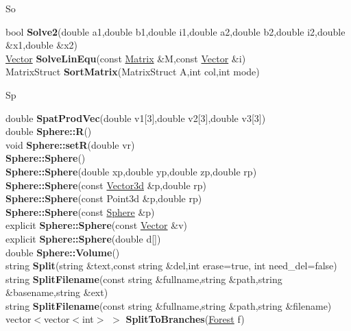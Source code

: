 \documentclass[10pt,titlepage]{article}
\def\functionlistentry#1#2#3#4#5#6{\noindent #1 {\bf #2}(#3) \dotfill #6\\}
\def\letterref#1{}
\def\letterlabel#1{\vspace{0.5cm}\centerline{\Large #1}}
\def\letterlabelend#1{}
\begin{document}
{{\letterlabel{So}
\letterref{A}
\letterref{B}
\letterref{C}
\letterref{D}
\letterref{E}
\letterref{F}
\letterref{G}
\letterref{H}
\letterref{I}
\letterref{K}
\letterref{L}
\letterref{M}
\letterref{N}
\letterref{O}
\letterref{P}
\letterref{Q}
\letterref{R}
\letterref{S}
\letterref{T}
\letterref{U}
\letterref{V}
\letterref{W}
\letterref{X}
\letterref{Y}
\letterref{Z}

\letterref{Sc}
\letterref{Se}
\letterref{Sh}
\letterref{Si}
\letterref{Sk}
\letterref{Sm}
\letterref{So}
\letterref{Sp}
\letterref{Sq}
\letterref{St}
\letterref{Su}
\letterlabelend{So}
\functionlistentry{bool}{Solve2}{double a1,double b1,double i1,double a2,double b2,double i2,double \&x1,double \&x2}{1124}{matrixAlgebra}{}
\functionlistentry{\hyperlink{Vector}{Vector}}{SolveLinEqu}{const \hyperlink{Matrix}{Matrix} \&M,const \hyperlink{Vector}{Vector} \&i}{1120}{matrixAlgebra}{}
\functionlistentry{MatrixStruct}{SortMatrix}{MatrixStruct A,int col,int mode}{1583}{obsolet}{}

\letterlabel{Sp}
\letterref{A}
\letterref{B}
\letterref{C}
\letterref{D}
\letterref{E}
\letterref{F}
\letterref{G}
\letterref{H}
\letterref{I}
\letterref{K}
\letterref{L}
\letterref{M}
\letterref{N}
\letterref{O}
\letterref{P}
\letterref{Q}
\letterref{R}
\letterref{S}
\letterref{T}
\letterref{U}
\letterref{V}
\letterref{W}
\letterref{X}
\letterref{Y}
\letterref{Z}

\letterref{Sc}
\letterref{Se}
\letterref{Sh}
\letterref{Si}
\letterref{Sk}
\letterref{Sm}
\letterref{So}
\letterref{Sp}
\letterref{Sq}
\letterref{St}
\letterref{Su}
\letterlabelend{Sp}
\functionlistentry{double}{SpatProdVec}{double v1[3],double v2[3],double v3[3]}{1564}{obsolet}{}
\functionlistentry{double}{Sphere::R}{}{656}{geoObject3d}{}
\functionlistentry{void}{Sphere::setR}{double vr}{657}{geoObject3d}{}
\functionlistentry{}{Sphere::Sphere}{}{649}{geoObject3d}{}
\functionlistentry{}{Sphere::Sphere}{double xp,double yp,double zp,double rp}{650}{geoObject3d}{}
\functionlistentry{}{Sphere::Sphere}{const \hyperlink{Vector3d}{Vector3d} \&p,double rp}{651}{geoObject3d}{}
\functionlistentry{}{Sphere::Sphere}{const Point3d \&p,double rp}{652}{geoObject3d}{}
\functionlistentry{}{Sphere::Sphere}{const \hyperlink{Sphere}{Sphere} \&p}{653}{geoObject3d}{}
\functionlistentry{explicit}{Sphere::Sphere}{const \hyperlink{Vector}{Vector} \&v}{654}{geoObject3d}{}
\functionlistentry{explicit}{Sphere::Sphere}{double d[]}{655}{geoObject3d}{}
\functionlistentry{double}{Sphere::Volume}{}{658}{geoObject3d}{}
\functionlistentry{string}{Split}{string \&text,const string \&del,int erase=true, int need\_del=false}{1413}{genericTools}{}
\functionlistentry{string}{SplitFilename}{const string \&fullname,string \&path,string \&basename,string \&ext}{1414}{genericTools}{}
\functionlistentry{string}{SplitFilename}{const string \&fullname,string \&path,string \&filename}{1415}{genericTools}{}
\functionlistentry{vector$<$vector$<$int$>$ $>$}{SplitToBranches}{\hyperlink{Forest}{Forest} f}{1297}{graph}{}

}}
\end{document}
